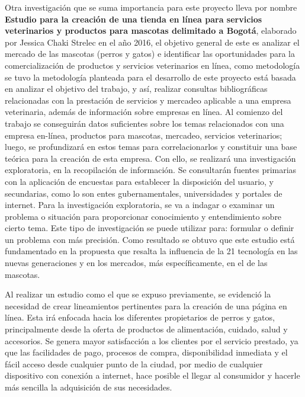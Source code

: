 Otra investigación que se suma importancia para este proyecto lleva por nombre 
\textbf{Estudio para la creación de una tienda en línea para servicios veterinarios y 
productos para mascotas delimitado a Bogotá}, elaborado por Jessica Chaki 
Strelec en el año 2016, el objetivo general de este es analizar el mercado de las 
mascotas (perros y gatos) e identificar las oportunidades para la comercialización 
de productos y servicios veterinarios en línea, como metodología se tuvo la 
metodología planteada para el desarrollo de este proyecto está basada en analizar 
el objetivo del trabajo, y así, realizar consultas bibliográficas relacionadas con la 
prestación de servicios y mercadeo aplicable a una empresa veterinaria, además 
de información sobre empresas en línea. 
Al comienzo del trabajo se conseguirán datos suficientes sobre los temas 
relacionados con una empresa en-línea, productos para mascotas, mercadeo, 
servicios veterinarios; luego, se profundizará en estos temas para correlacionarlos 
y constituir una base teórica para la creación de esta empresa. Con ello, se 
realizará una investigación exploratoria, en la recopilación de información. Se 
consultarán fuentes primarias con la aplicación de encuestas para establecer la 
disposición del usuario, y secundarias, como lo son entes gubernamentales, 
universidades y portales de internet. Para la investigación exploratoria, se va a 
indagar o examinar un problema o situación para proporcionar conocimiento y 
entendimiento sobre cierto tema. Este tipo de investigación se puede utilizar para: 
formular o definir un problema con más precisión. Como resultado se obtuvo que 
este estudio está fundamentado en la propuesta que resalta la influencia de la 
21
tecnología en las nuevas generaciones y en los mercados, más específicamente, 
en el de las mascotas.

Al realizar un estudio como el que se expuso previamente, se evidenció la 
necesidad de crear lineamientos pertinentes para la creación de una página en línea. Esta irá enfocada hacia los diferentes propietarios de perros y gatos, 
principalmente desde la oferta de productos de alimentación, cuidado, salud y 
accesorios. Se genera mayor satisfacción a los clientes por el servicio prestado, 
ya que las facilidades de pago, procesos de compra, disponibilidad inmediata y el 
fácil acceso desde cualquier punto de la ciudad, por medio de cualquier dispositivo 
con conexión a internet, hace posible el llegar al consumidor y hacerle más 
sencilla la adquisición de sus necesidades.

